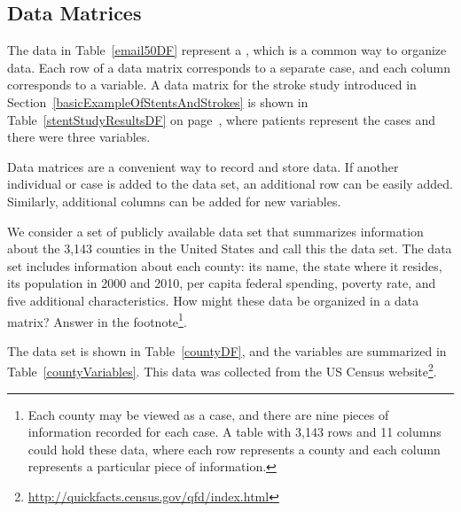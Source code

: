 


\subsection{Data Matrices}

The data in Table~\ref{email50DF} represent a , which is a common way to organize data. Each row of a data matrix corresponds to a separate case, and each column corresponds to a variable. A data matrix for the stroke study introduced in Section~\ref{basicExampleOfStentsAndStrokes} is shown in Table~\ref{stentStudyResultsDF} on page~\pageref{stentStudyResultsDF}, where patients represent the cases and there were three variables.

Data matrices are a convenient way to record and store data. If another individual or case is added to the data set, an additional row can be easily added. Similarly, additional columns can be added for new variables.


\begin{exercise}
We consider a set of publicly available data set that summarizes information about the 3,143 counties in the United States and call this the  data set. The  data set includes information about each county: its name, the state where it resides, its population in 2000 and 2010, per capita federal spending, poverty rate, and five additional characteristics. How might these data be organized in a data matrix? Answer in the footnote\footnote{Each county may be viewed as a case, and there are nine pieces of information recorded for each case. A table with 3,143 rows and 11 columns could hold these data, where each row represents a county and each column represents a particular piece of information.}.
\end{exercise}

\noindent The  data set is shown in Table~\ref{countyDF}, and the variables are summarized in Table~\ref{countyVariables}. This data was collected from the US Census website\footnote{\url{http://quickfacts.census.gov/qfd/index.html}}. 

